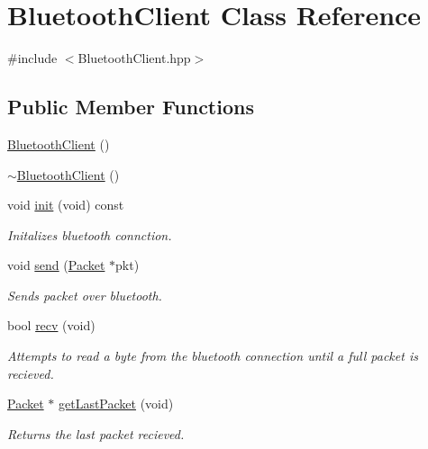 \hypertarget{class_bluetooth_client}{}\section{Bluetooth\+Client Class Reference}
\label{class_bluetooth_client}


{\ttfamily \#include $<$Bluetooth\+Client.\+hpp$>$}

\subsection*{Public Member Functions}
\begin{DoxyCompactItemize}
\item 
\hyperlink{class_bluetooth_client_a5ee534b5d9823be1e297f037c50beaf6}{Bluetooth\+Client} ()
\item 
\hyperlink{class_bluetooth_client_a9332d63f912766c70754b5eeb52800bf}{$\sim$\+Bluetooth\+Client} ()
\item 
void \hyperlink{class_bluetooth_client_ac054e730dd69d8e323781305ea1a610f}{init} (void) const
\begin{DoxyCompactList}\small\item\em Initalizes bluetooth connction. \end{DoxyCompactList}\item 
void \hyperlink{class_bluetooth_client_a0f0d9b99f80c2eab9d9d33d8aca91bf6}{send} (\hyperlink{class_packet}{Packet} $\ast$pkt)
\begin{DoxyCompactList}\small\item\em Sends packet over bluetooth. \end{DoxyCompactList}\item 
bool \hyperlink{class_bluetooth_client_a938b0f547b483ff7d0ac5e64260a9c37}{recv} (void)
\begin{DoxyCompactList}\small\item\em Attempts to read a byte from the bluetooth connection until a full packet is recieved. \end{DoxyCompactList}\item 
\hyperlink{class_packet}{Packet} $\ast$ \hyperlink{class_bluetooth_client_ad009775f3bd7e30c53f2e1544bc83828}{get\+Last\+Packet} (void)
\begin{DoxyCompactList}\small\item\em Returns the last packet recieved. \end{DoxyCompactList}\end{DoxyCompactItemize}
